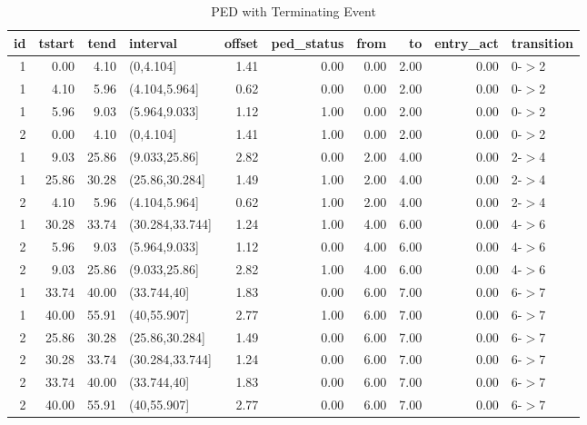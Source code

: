 \begin{table}[ht]
\centering
\begin{tabular}{rrrlrrrrrl}
  \toprule
id & tstart & tend & interval & offset & ped\_status & from & to & entry\_act & transition \\ 
  \midrule
  1 & 0.00 & 4.10 & (0,4.104] & 1.41 & 0.00 & 0.00 & 2.00 & 0.00 & 0-$>$2 \\ 
    1 & 4.10 & 5.96 & (4.104,5.964] & 0.62 & 0.00 & 0.00 & 2.00 & 0.00 & 0-$>$2 \\ 
    1 & 5.96 & 9.03 & (5.964,9.033] & 1.12 & 1.00 & 0.00 & 2.00 & 0.00 & 0-$>$2 \\ 
    2 & 0.00 & 4.10 & (0,4.104] & 1.41 & 1.00 & 0.00 & 2.00 & 0.00 & 0-$>$2 \\ 
    1 & 9.03 & 25.86 & (9.033,25.86] & 2.82 & 0.00 & 2.00 & 4.00 & 0.00 & 2-$>$4 \\ 
    1 & 25.86 & 30.28 & (25.86,30.284] & 1.49 & 1.00 & 2.00 & 4.00 & 0.00 & 2-$>$4 \\ 
    2 & 4.10 & 5.96 & (4.104,5.964] & 0.62 & 1.00 & 2.00 & 4.00 & 0.00 & 2-$>$4 \\ 
    1 & 30.28 & 33.74 & (30.284,33.744] & 1.24 & 1.00 & 4.00 & 6.00 & 0.00 & 4-$>$6 \\ 
    2 & 5.96 & 9.03 & (5.964,9.033] & 1.12 & 0.00 & 4.00 & 6.00 & 0.00 & 4-$>$6 \\ 
    2 & 9.03 & 25.86 & (9.033,25.86] & 2.82 & 1.00 & 4.00 & 6.00 & 0.00 & 4-$>$6 \\ 
    1 & 33.74 & 40.00 & (33.744,40] & 1.83 & 0.00 & 6.00 & 7.00 & 0.00 & 6-$>$7 \\ 
    1 & 40.00 & 55.91 & (40,55.907] & 2.77 & 1.00 & 6.00 & 7.00 & 0.00 & 6-$>$7 \\ 
    2 & 25.86 & 30.28 & (25.86,30.284] & 1.49 & 0.00 & 6.00 & 7.00 & 0.00 & 6-$>$7 \\ 
    2 & 30.28 & 33.74 & (30.284,33.744] & 1.24 & 0.00 & 6.00 & 7.00 & 0.00 & 6-$>$7 \\ 
    2 & 33.74 & 40.00 & (33.744,40] & 1.83 & 0.00 & 6.00 & 7.00 & 0.00 & 6-$>$7 \\ 
    2 & 40.00 & 55.91 & (40,55.907] & 2.77 & 0.00 & 6.00 & 7.00 & 0.00 & 6-$>$7 \\ 
   \bottomrule
\end{tabular}
\caption{PED with Terminating Event} 
\end{table}
